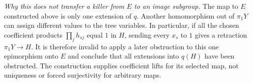 \emph{Why this does not transfer a killer from $E$ to an image subgroup.}
The map to $E$ constructed above is only one extension of $q$.
Another homomorphism out of $\pi_1Y$ can assign different values to the
tree variables. In particular, if all the chosen coefficient products
$\prod_jh_{sj}$ equal $1$ in $H$, sending every $x_s$ to $1$ gives a
retraction $\pi_1Y\to H$. It is therefore invalid to apply a later
obstruction to this one epimorphism onto $E$ and conclude that all
extensions into $q(H)$ have been obstructed. The construction supplies
coefficient lifts for its selected map, not uniqueness or forced
surjectivity for arbitrary maps.
